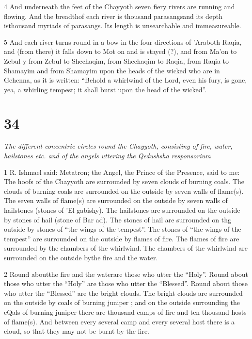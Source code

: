 \par 4 And underneath the feet of the Chayyoth seven fiery rivers are running and flowing. And the breadthof each river is thousand parasangsand its depth isthousand myriads of parasangs. Its length is unsearchable and immeasureable. 

\par 5 And each river turns round in a bow in the four directions of 'Araboth Raqia, and (from there) it falls down to Mot on and is stayed (?), and from Ma'on to Zebul y from Zebul to Shechaqim, from Shechaqim to Raqia, from Raqia to Shamayim and from Shamayim upon the heads of the wicked who are in Gehenna, as it is written: “Behold a whirlwind of the Lord, even his fury, is gone, yea, a whirling tempest; it shall burst upon the head of the wicked”.

\chapter{34}

\par \textit{The different concentric circles round the Chayyoth, consisting of fire, water, hailstones etc. and of the angels uttering the Qedushsha responsorium}

\par 1 R. Ishmael said: Metatron; the Angel, the Prince of the Presence, said to me: The hoofs of the Chayyoth are surrounded by seven clouds of burning coals. The clouds of burning coals are surrounded on the outside by seven walls of flame(s). The seven walls of flame(s) are surrounded on the outside by seven walls of hailstones (stones of 'El-gabishy). The hailstones are surrounded on the outside by stones of hail (stone of Bar ad). The stones of hail are surrounded on thg outside by stones of “the wings of the tempest”. The stones of “the wings of the tempest” are surrounded on the outside by flames of fire. The flames of fire are surrounded by the chambers of the whirlwind. The chambers of the whirlwind are surrounded on the outside bythe fire and the water. 

\par 2 Round aboutthe fire and the waterare those who utter the “Holy”. Round about those who utter the “Holy” are those who utter the “Blessed”. Round about those who utter the “Blessed” are the bright clouds. The bright clouds are surrounded on the outside by coals of burning juniper ; and on the outside surrounding the cQals of burning juniper there are thousand camps of fire and ten thousand hosts of flame(s). And between every several camp and every several host there is a cloud, so that they may not be burnt by the fire. 

